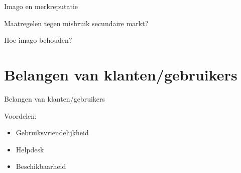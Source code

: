 \documentclass{beamer}
\begin{document}
\begin{frame}{Imago en merkreputatie}
    \begin{itemize}
        \LARGE{
            \item Maatregelen tegen misbruik secundaire markt?
            \item Hoe imago behouden?
        }
    \end{itemize}
\end{frame}


\section[Gebruikersbelangen]{Belangen van klanten/gebruikers}
% 
% 
\begin{frame}{Belangen van klanten/gebruikers}
    \LARGE{
        Voordelen:
        \begin{itemize}
            \item Gebruiksvriendelijkheid
            \item Helpdesk
            \item Beschikbaarheid
        \end{itemize}
    }
\end{frame}
\end{document}
